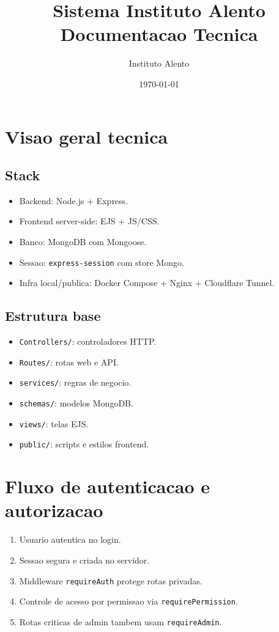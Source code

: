\documentclass[12pt,a4paper]{article}
\title{Sistema Instituto Alento \\ Documentacao Tecnica}
\author{Instituto Alento}
\date{\today}
\begin{document}
\maketitle
\tableofcontents
\newpage

\section{Visao geral tecnica}
\subsection{Stack}
\begin{itemize}[leftmargin=*]
\item Backend: Node.js + Express.
\item Frontend server-side: EJS + JS/CSS.
\item Banco: MongoDB com Mongoose.
\item Sessao: \texttt{express-session} com store Mongo.
\item Infra local/publica: Docker Compose + Nginx + Cloudflare Tunnel.
\end{itemize}

\subsection{Estrutura base}
\begin{itemize}[leftmargin=*]
\item \texttt{Controllers/}: controladores HTTP.
\item \texttt{Routes/}: rotas web e API.
\item \texttt{services/}: regras de negocio.
\item \texttt{schemas/}: modelos MongoDB.
\item \texttt{views/}: telas EJS.
\item \texttt{public/}: scripts e estilos frontend.
\end{itemize}

\section{Fluxo de autenticacao e autorizacao}
\begin{enumerate}
\item Usuario autentica no login.
\item Sessao segura e criada no servidor.
\item Middleware \texttt{requireAuth} protege rotas privadas.
\item Controle de acesso por permissao via \texttt{requirePermission}.
\item Rotas criticas de admin tambem usam \texttt{requireAdmin}.
\end{enumerate}
\end{document}
